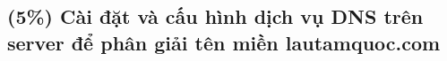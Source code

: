 \subsection{(5\%) Cài đặt và cấu hình dịch vụ DNS trên server để phân giải tên miền
  lautamquoc.com}
